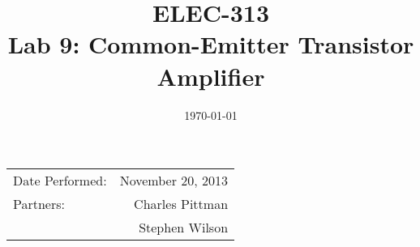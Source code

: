 \documentclass{article}
\author{}
\title{ELEC-313 \\ Lab 9: Common-Emitter Transistor Amplifier\\ }
\date{\today}
\begin{document}
\maketitle

\begin{center}
  \begin{tabular}{lr}
    Date Performed: & November 20, 2013 \\
    Partners:       & Charles Pittman    \\
    & Stephen Wilson     \\
  \end{tabular}
\end{center}

\newpage


\end{document}
